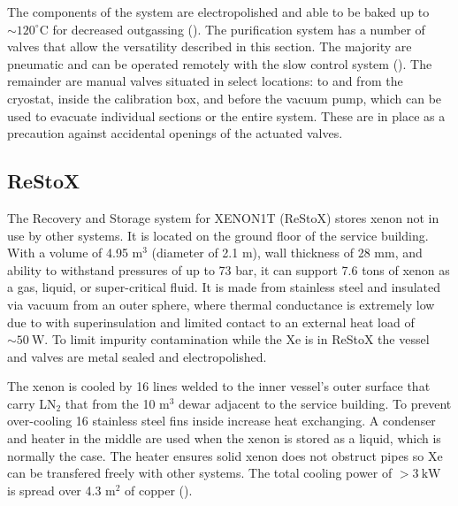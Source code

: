 The components of the system are electropolished and able to be baked up to ${\sim} 120^{\circ}\mathrm{C}$ for decreased outgassing
().  The purification system has a number of valves that allow the versatility described in this section.  The majority are
pneumatic and can
be operated remotely with the slow control system ().  The remainder are manual valves
situated in select locations: to and from the cryostat,
inside the calibration box, and before the vacuum pump, which can be used to evacuate individual sections or the entire system.  These are
in place as a precaution against accidental openings of the actuated valves.


\subsection{ReStoX}
\label{subsec:xenon1t_restox}
The Recovery and Storage system for XENON1T (ReStoX) stores xenon not in use by other systems.  It is located on the ground floor of the
service building.  With a volume of 4.95 m$^{3}$
(diameter of 2.1 m), wall thickness of 28 mm, and ability to withstand pressures of up to 73 bar, it can support 7.6 tons of
xenon
as a gas, liquid, or super-critical fluid.  It is made from stainless steel and insulated via vacuum from an outer sphere, where
thermal conductance is extremely low due to with superinsulation and limited contact to an external heat load of
${\sim}50\ \mathrm{W}$.  To limit
impurity contamination while the Xe is in ReStoX the vessel and valves are metal sealed and electropolished.

The xenon is cooled by 16 lines welded to the inner vessel's outer surface that carry LN$_2$ that from the 10 m$^3$ dewar adjacent to the
service building.  To prevent over-cooling 16 stainless steel fins inside increase heat
exchanging.  A condenser and heater in the middle are used when the xenon is stored as a liquid, which is normally the case.  The heater
ensures solid xenon does not obstruct pipes so Xe can be transfered freely with other systems.  The total cooling power of
$> 3\ \mathrm{kW}$ is spread over 4.3 m$^2$ of copper ().


